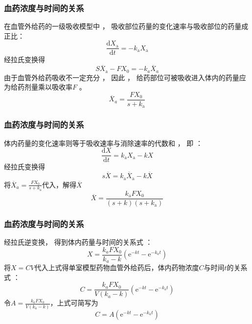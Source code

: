 \documentclass[dvipsnames, svgnames, x11names]{beamer}
\begin{document}
\begin{frame}
    \frametitle{血药浓度与时间的关系}
    \begin{center}
    \end{center}
    在血管外给药的一级吸收模型中 ， 吸收部位药量的变化速率与吸收部位的药量成正比：
    \[
        \frac{\mathrm{d}X_{\mathrm{a}}}{\mathrm{d}t}=-k_{\mathrm{a}}X_{\mathrm{a}}
    \]
    经拉氏变换得
    \[
        S\overline{X}_{\mathrm{a}}-FX_{0}=-k_{a}\overline{X}_{a}
    \]
    由于血管外给药吸收不一定充分 ， 因此 ， 给药部位可被吸收进入体内的药量应为给药剂量乘以吸收率$F$ 。
    \[
        \overline{X}_{a}=\frac{FX_0}{s+k_{\mathrm{a}}}
    \]
\end{frame}


\begin{frame}
    \frametitle{血药浓度与时间的关系}
    \begin{center}
    \end{center}
    体内药量的变化速率则等于吸收速率与消除速率的代数和 ， 即 ：
    \[
        \frac{\mathrm{d}X}{\mathrm{d}t}=k_{\mathrm{a}}X_{\mathrm{a}}-kX
    \]
    经拉氏变换得
    \[
        s\overline{X}=k_{\mathrm{a}}\overline{X}_{\mathrm{a}}-k\overline{X}
    \]
    将$\overline{X}_{a}=\frac{FX_0}{s+k_{\mathrm{a}}}$代入，解得$\overline{X}$
    \[
        \overline{X}=\frac{k_{\mathrm{a}}FX_{0}}{(s+k)(s+k_{\mathrm{a}})}
    \]
    
\end{frame}


\begin{frame}
    \frametitle{血药浓度与时间的关系}
    经拉氏逆变换， 得到体内药量与时间的关系式 ：
    \[
        X=\frac{k_{a}FX_0}{k_{a}-k}(\mathrm{e}^{-kt}-\mathrm{e}^{-k_{a}t})
    \]
    将$X=CV$代入上式得单室模型药物血管外给药后，体内药物浓度$C$与时间$t$的关系式 ：
    \[
        C=\frac{k_{a}FX_0}{V(k_{a}-k)}(\mathrm{e}^{-kt}-\mathrm{e}^{-k_\mathrm{a}t})
    \]
    令$A=\frac{k_{a}FX_0}{V(k_{a}-k)}$，上式可简写为
    \[
        C=A(\mathrm{e}^{-kt}-\mathrm{e}^{-k_{a}t})
    \]
\end{frame}
\end{document}
